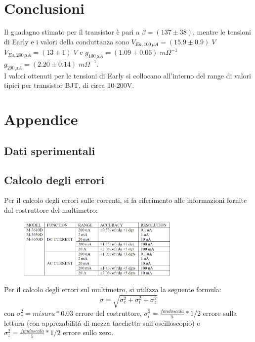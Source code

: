 \documentclass{article}
\begin{document}
\section{Conclusioni}
Il guadagno stimato per il transistor è pari a $\beta=(137\pm38)$, mentre le tensioni di Early e i valori della conduttanza sono $V_{Ea,100\,\mu A}=(15.9\pm 0.9) \;V$ $V_{Ea,200\,\mu A}=(13\pm 1) \;V $ e $g_{100 \,\mu A}=(1.09 \pm 0.06) \;m\Omega^{-1} $ $g_{200 \, \mu A}=(2.20 \pm 0.14) \;m\Omega^{-1}$.\\
I valori ottenuti per le tensioni di Early si collocano all'interno del range di valori tipici per transistor BJT, di circa 10-200V.


\newpage
\section{Appendice}

\subsection{Dati sperimentali}


\subsection{Calcolo degli errori}
Per il calcolo degli errori sulle correnti, si fa riferimento alle informazioni fornite dal costruttore del multimetro:
\begin{figure}[H]
    \centering
    \includegraphics[width=0.7\textwidth]{Errore_multimetro.jpg}
\end{figure}
Per il calcolo degli errori sul multimetro, si utilizza la seguente formula:
\begin{equation}
    \sigma=\sqrt{\sigma_c^2+\sigma_l^2+\sigma_z^2}
\end{equation}
con $\sigma_c^2 = misura*0.03$ errore del costruttore, $\sigma_l^2= \frac{fondo scala}{5}*1/2$ errore sulla lettura (con apprezabilità di mezza tacchetta sull'oscilloscopio) e $\sigma_z^2= \frac{fondo scala}{5}*1/2$ errore sullo zero.
\end{document}
